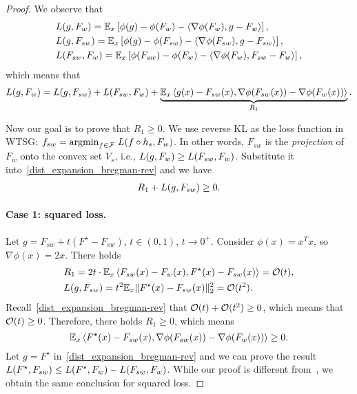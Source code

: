


\begin{proof}

We observe that
\begin{align*}
    & L(g, F_w) = \mathbb{E}_x \left[ \phi(g) - \phi(F_w) - \left \langle \nabla \phi(F_w), g-F_w \right \rangle \right], \\
    & L(g, F_{sw}) = \mathbb{E}_x \left[ \phi(g) - \phi(F_{sw}) - \left \langle \nabla \phi(F_{sw}), g-F_{sw} \right \rangle \right], \\
    & L(F_{sw}, F_w) = \mathbb{E}_x \left[\phi(F_{sw}) - \phi(F_w) - \left \langle \nabla \phi(F_w), F_{sw}-F_w \right \rangle \right],
\end{align*}
which means that
\begin{align} \label{dist_expansion_bregman-rev}
    L(g, F_w) = L(g, F_{sw}) + L(F_{sw}, F_w) + \underbrace{\mathbb{E}_x \left \langle g(x)-F_{sw}(x), \nabla \phi(F_{sw}(x)) - \nabla \phi(F_w(x)) \right \rangle}_{R_1}.
\end{align}

Now our goal is to prove that $R_1 \ge 0$.
We use reverse KL as the loss function in WTSG: $f_{sw} = \text{argmin}_{f \in \mathcal{F}}\; L(f \circ h_s, F_w)$.
In other words, $F_{sw}$ is the \textit{projection} of $F_w$ onto the convex set $V_s$, i.e., $L(g, F_w) \ge L(F_{sw}, F_w)$.
Substitute it into~\cref{dist_expansion_bregman-rev} and we have
\begin{align} \label{bregman:disc-rev}
    R_1 + L(g, F_{sw}) \ge 0.
\end{align}

\paragraph{Case 1: squared loss.}
Let $g=F_{sw} + t(F^\star-F_{sw})$, $t \in (0,1)$, $t \to 0^+$.
Consider $\phi(x)=x^Tx$, so $\nabla \phi(x)=2x$.
There holds
\begin{align*}
    & R_1 = 2t \cdot \mathbb{E}_x \left \langle F_{sw}(x)-F_w(x), F^\star(x)-F_{sw}(x) \right \rangle = \mathcal{O}(t), \\
    & L(g, F_{sw}) = t^2 \mathbb{E}_x \| F^\star(x) - F_{sw}(x) \|_2^2 = \mathcal{O}(t^2).
\end{align*}
Recall~\cref{dist_expansion_bregman-rev} that $\mathcal{O}(t) + \mathcal{O}(t^2) \ge 0$, which means that $\mathcal{O}(t) \ge 0$.
Therefore, there holds $R_1 \ge 0$, which means
$$\mathbb{E}_x \left \langle F^\star(x)-F_{sw}(x), \nabla \phi(F_{sw}(x)) - \nabla \phi(F_w(x)) \right \rangle \ge 0.$$
Let $g=F^\star$ in~\cref{dist_expansion_bregman-rev} and we can prove the result $L(F^\star, F_{sw}) \le L(F^\star, F_w) - L(F_{sw}, F_w)$.
While our proof is different from~\citet{charikar2024quantifying}, we obtain the same conclusion for squared loss.



\end{proof}
